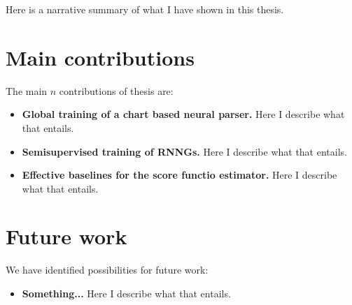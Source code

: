 Here is a narrative summary of what I have shown in this thesis.

\section{Main contributions}
The main $n$ contributions of thesis are:
\begin{itemize}
  \item \textbf{Global training of a chart based neural parser.} Here I describe what that entails.
  \item \textbf{Semisupervised training of RNNGs.} Here I describe what that entails.
  \item \textbf{Effective baselines for the score functio estimator.} Here I describe what that entails.
\end{itemize}


\section{Future work}
We have identified possibilities for future work:
\begin{itemize}
  \item \textbf{Something...} Here I describe what that entails.
\end{itemize}
